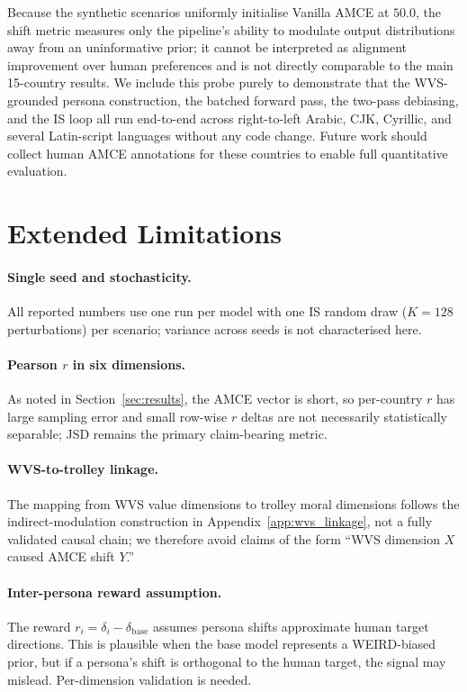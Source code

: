\documentclass{article}
\begin{document}
Because the synthetic scenarios uniformly initialise Vanilla AMCE at $50.0$, the
shift metric measures only the pipeline's ability to modulate output
distributions away from an uninformative prior; it cannot be interpreted as
alignment improvement over human preferences and is not directly comparable to
the main 15-country results. We include this probe purely to demonstrate that the
WVS-grounded persona construction, the batched forward pass, the two-pass
debiasing, and the IS loop all run end-to-end across right-to-left Arabic,
CJK, Cyrillic, and several Latin-script languages without any code change.
Future work should collect human AMCE annotations for these countries to enable
full quantitative evaluation.

\section{Extended Limitations}
\label{app:limitations}

\paragraph{Single seed and stochasticity.}
All reported numbers use one run per model with one IS random draw ($K{=}128$
perturbations) per scenario; variance across seeds is not characterised here.

\paragraph{Pearson $r$ in six dimensions.}
As noted in Section~\ref{sec:results}, the AMCE vector is short, so per-country
$r$ has large sampling error and small row-wise $r$ deltas are not necessarily
statistically separable; JSD remains the primary claim-bearing metric.

\paragraph{WVS-to-trolley linkage.}
The mapping from WVS value dimensions to trolley moral dimensions follows the
indirect-modulation construction in Appendix~\ref{app:wvs_linkage}, not a fully
validated causal chain; we therefore avoid claims of the form ``WVS dimension $X$
caused AMCE shift $Y$.''

\paragraph{Inter-persona reward assumption.}
The reward $r_i = \delta_i - \delta_{\text{base}}$ assumes persona shifts approximate
human target directions. This is plausible when the base model represents a WEIRD-biased
prior, but if a persona's shift is orthogonal to the human target, the signal may
mislead. Per-dimension validation is needed.
\end{document}
